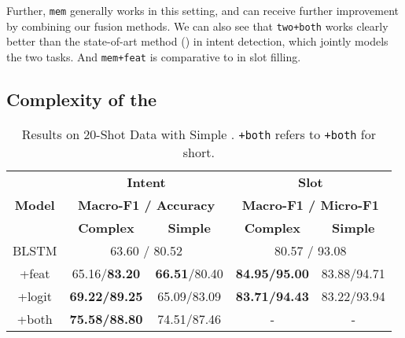 Further, \texttt{mem} generally works in this setting, and can receive further improvement
by combining our fusion methods.
We can also see that \texttt{two+both} works clearly better than the state-of-art method (\LL) in intent detection, which jointly models the two tasks. And \texttt{mem+feat} is comparative to \LL in slot filling.

\subsection{Complexity of the \RE}
\label{sec_complexity}
\begin{table}
\setlength{\tabcolsep}{0.23em}
\centering
\small{
\begin{tabular}{|c|c|c|c|c|}

\hline
\multirow{3}{*}{\textbf{Model}}  & \multicolumn{2}{|c|}{\textbf{Intent}} & \multicolumn{2}{|c|}{\textbf{Slot}}  \\
\cline{2-5}
  & \multicolumn{2}{|c|}{\textbf{Macro-F1 / Accuracy}} & \multicolumn{2}{|c|}{\textbf{Macro-F1 / Micro-F1}}  \\
\cline{2-5}
  & \textbf{Complex} & \textbf{Simple} & \textbf{Complex} & \textbf{Simple} \\
\hline
\rowcolor{Gray} BLSTM & \multicolumn{2}{|c|}{63.60 / 80.52} & \multicolumn{2}{|c|}{80.57 / 93.08}  \\
\hline
+feat & 65.16/\textbf{83.20} & \textbf{66.51}/80.40 & \textbf{84.95/95.00} & 83.88/94.71 \\
\hline
\rowcolor{Gray} +logit & \textbf{69.22/89.25} & 65.09/83.09 & \textbf{83.71/94.43} & 83.22/93.94  \\
\hline
+both & \textbf{75.58/88.80} & 74.51/87.46 & - & - \\
\hline
\end{tabular}
}
\caption{Results on 20-Shot Data with Simple \REs. \texttt{+both} refers to \ptatt\texttt{+both} for short.}
\label{tab_simple}
\end{table}

